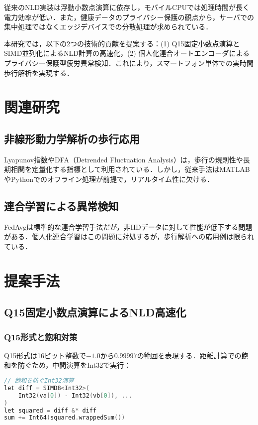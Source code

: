 \documentclass[paper]{ieice}
\begin{document}
従来のNLD実装は浮動小数点演算に依存し，モバイルCPUでは処理時間が長く電力効率が低い\cite{apple2021}．また，健康データのプライバシー保護の観点から，サーバでの集中処理ではなくエッジデバイスでの分散処理が求められている\cite{mcmahan2017}．

本研究では，以下の2つの技術的貢献を提案する：(1) Q15固定小数点演算とSIMD並列化によるNLD計算の高速化，(2) 個人化連合オートエンコーダによるプライバシー保護型疲労異常検知．これにより，スマートフォン単体での実時間歩行解析を実現する．

\section{関連研究}

\subsection{非線形動力学解析の歩行応用}
Lyapunov指数\cite{rosenstein1993}やDFA（Detrended Fluctuation Analysis）\cite{peng1994}は，歩行の規則性や長期相関を定量化する指標として利用されている．しかし，従来手法はMATLABやPythonでのオフライン処理が前提で，リアルタイム性に欠ける．

\subsection{連合学習による異常検知}
FedAvg\cite{mcmahan2021}は標準的な連合学習手法だが，非IIDデータに対して性能が低下する問題がある．個人化連合学習\cite{li2020}はこの問題に対処するが，歩行解析への応用例は限られている．

\section{提案手法}

\subsection{Q15固定小数点演算によるNLD高速化}

\subsubsection{Q15形式と飽和対策}
Q15形式は16ビット整数で$-1.0$から$0.99997$の範囲を表現する．距離計算での飽和を防ぐため，中間演算をInt32で実行：

\begin{lstlisting}[language=C]
// 飽和を防ぐInt32演算
let diff = SIMD8<Int32>(
    Int32(va[0]) - Int32(vb[0]), ...
)
let squared = diff &* diff
sum += Int64(squared.wrappedSum())
\end{lstlisting}
\end{document}
